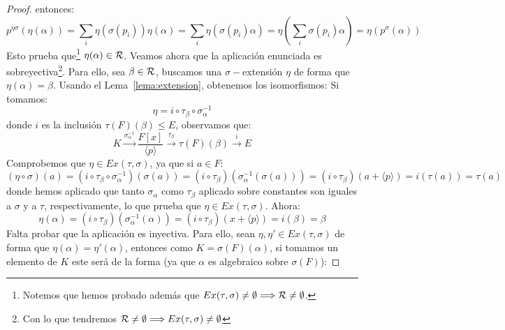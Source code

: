 \begin{prop}
\begin{proof}
        entonces:
        \begin{equation*}
            p^{\eta\sigma}(\eta(\alpha)) = \sum_i \eta(\sigma(p_i)) \eta(\alpha) = \sum_i \eta(\sigma(p_i)\alpha) = \eta\left(\sum_i \sigma(p_i) \alpha\right) = \eta(p^\sigma(\alpha))
        \end{equation*}
        Esto prueba que\footnote{Notemos que hemos probado además que $Ex(\tau,\sigma)\neq \emptyset \Longrightarrow \mathcal{R}\neq \emptyset $.} $\eta(\alpha)\in \mathcal{R}$. Veamos ahora que la aplicación enunciada es sobreyectiva\footnote{Con lo que tendremos $\mathcal{R}\neq \emptyset \Longrightarrow Ex(\tau,\sigma)\neq \emptyset $}. Para ello, sea $\beta\in \mathcal{R}$, buscamos una $\sigma-$extensión $\eta$ de forma que $\eta(\alpha) = \beta$. Usando el Lema~\ref{lema:extension}, obtenemos los isomorfismos:
        Si tomamos:
        \begin{equation*}
            \eta = i \circ \tau_\beta \circ \sigma_\alpha^{-1}
        \end{equation*}
        donde $i$ es la inclusión $\tau(F)(\beta)\leq E$, observamos que:
        \begin{equation*}
            K\stackrel{\sigma_\alpha^{-1}}{\longrightarrow} \frac{F[x]}{\langle p \rangle } \stackrel{\tau_\beta}{\longrightarrow} \tau(F)(\beta) \stackrel{i}{\longrightarrow} E
        \end{equation*}
        Comprobemos que $\eta\in Ex(\tau,\sigma)$, ya que si $a\in F$:
        \begin{equation*}
            (\eta \circ \sigma)(a) = (i\circ \tau_\beta\circ \sigma_\alpha^{-1})(\sigma(a)) = (i\circ \tau_\beta)(\sigma_\alpha^{-1}(\sigma(a))) = (i\circ \tau_\beta)(a+\langle p \rangle ) = i(\tau(a)) = \tau(a)
        \end{equation*}
        donde hemos aplicado que tanto $\sigma_\alpha$ como $\tau_\beta$ aplicado sobre constantes son iguales a $\sigma$ y a $\tau$, respectivamente, lo que prueba que $\eta\in Ex(\tau,\sigma)$. Ahora:
        \begin{equation*}
            \eta(\alpha) = (i\circ \tau_\beta)(\sigma_\alpha^{-1}(\alpha))= (i\circ \tau_\beta)(x+\langle p \rangle ) = i(\beta) = \beta
        \end{equation*}
        Falta probar que la aplicación es inyectiva. Para ello, sean $\eta,\eta' \in Ex(\tau,\sigma)$ de forma que $\eta(\alpha)=\eta'(\alpha)$, entonces como $K=\sigma(F)(\alpha)$, si tomamos un elemento de $K$ este será de la forma (ya que $\alpha$ es algebraico sobre $\sigma(F)$):

\end{proof}
\end{prop}
